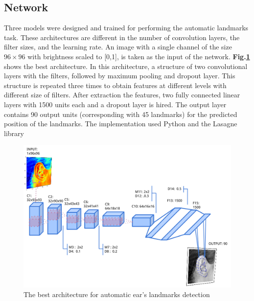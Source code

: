 \subsection{Network}
Three models were designed and trained for performing the automatic landmarks task. These architectures are different in the number of convolution layers, the filter sizes, and the learning rate. An image with a single channel of the size  $96 \times 96$ with brightness scaled to [0,1], is taken as the input of the network. \textbf{Fig.\ref{1Econv}} shows the best architecture. In this architecture, a structure of two convolutional layers with the filters, followed by maximum pooling and dropout layer. This structure is repeated three times to obtain features at different levels with different size of filters. After extraction the features, two fully connected linear layers with 1500 units each and a dropout layer is hired. The output layer contains 90 output units (corresponding with 45 landmarks) for the predicted position of the landmarks. The implementation used Python and the Lasagne library \cite{}
\begin{figure}[h!]
	\centering
	\includegraphics[scale=0.27]{images/ear_cnn}
	\caption{The best architecture for automatic ear's landmarks detection}
	\label{1Econv}
\end{figure}
